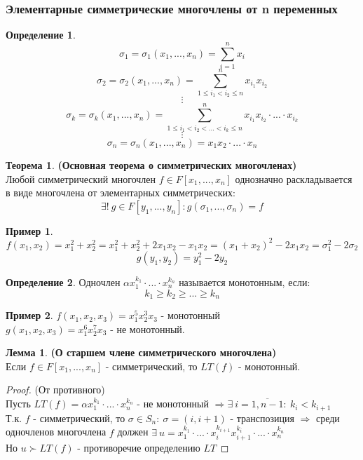 \documentclass[a4paper, 12pt]{article}
\newcommand\tab[1][.5cm]{\hspace*{#1}}
\newcounter{lemcount}
\newcounter{lemcount2}
\newcounter{thcount}
\theoremstyle{definition}
\newtheorem*{definition}{Определение}
\newtheorem*{example1}{Пример}
\newtheorem{lemmanum}[lemcount]{Лемма}
\newtheorem{theoremnum}[thcount]{Теорема}
\begin{document}
  \subsubsection{Элементарные симметрические многочлены от n переменных}
  \begin{definition}
    $$\sigma_1 = \sigma_1(x_1,...,x_n) = \sum \limits_{i=1}^n x_i$$
    $$\sigma_2 = \sigma_2(x_1,...,x_n) = \sum \limits_{1\leq i_1 < i_2 \leq n}^n x_{i_1}x_{i_2}$$
    $$\vdots$$ 
    $$\sigma_k = \sigma_k(x_1,...,x_n) = \sum \limits_{1\leq i_1 < i_2<...<i_k \leq n}^n x_{i_1}x_{i_2} \cdot ... \cdot x_{i_k}$$
    $$\vdots$$
    $$\sigma_n = \sigma_n(x_1,...,x_n) = x_{1}x_{2} \cdot ... \cdot x_{n}$$      
  \end{definition}
  \begin{theoremnum} \textbf{(Основная теорема о симметрических многочленах)} \\
    Любой симметрический многочлен $f \in F[x_1,...,x_n]$ однозначно раскладывается в виде многочлена от элементарных симметрических: 
    $$\exists ! \ g \in F[y_1,...,y_n] : g(\sigma_1,...,\sigma_n) = f$$
  \end{theoremnum}
  \begin{example1}
    $$f(x_1, x_2) = x_1^2 + x_2^2 = x_1^2 + x_2^2 + 2x_1x_2 - x_1x_2 = (x_1+x_2)^2 - 2x_1x_2 = \sigma_1^2 - 2 \sigma_2$$
    $$g(y_1,y_2) = y_1^2 - 2y_2$$  
  \end{example1}
  \begin{definition}
    Одночлен $\alpha x_1^{k_1} \cdot ... \cdot x_n^{k_n}$ называется монотонным, если: 
    $$k_1\geq k_2 \geq ... \geq k_n$$  
  \end{definition}
  \begin{example1}
    $f(x_1,x_2,x_3) = x_1^5x_2^3x_3$ - монотонный \\
    \tab[2.33cm]$g(x_1,x_2,x_3) = x_1^6x_2^7x_3$ - не монотонный.  
  \end{example1}
  \setcounter{lemcount}{0}
  \begin{lemmanum} \textbf{(О старшем члене симметрического многочлена)} \\
    Если $f \in F[x_1,...,x_n]$ - симметрический, то $LT(f)$ - монотонный. 
  \end{lemmanum}
  \begin{proof} (От противного)\\
    Пусть $LT(f) = \alpha x_1^{k_1} \cdot ... \cdot x_n^{k_n}$ - не монотонный $\Longrightarrow \exists \ i = \overline{1,n-1}: \ k_i<k_{i+1}$\\
    Т.к. $f$ - симметрический, то $\sigma \in S_n: \ \sigma = (i, i+1)$ - транспозиция $\Longrightarrow $ среди одночленов многочлена $f$ должен $\exists \ u = x_1^{k_1} \cdot ... \cdot x_i^{k_{i+1}}x_{i+1}^{k_i} \cdot ... \cdot x_n^{k_n}$\\
    Но $u \succ LT(f)$ - противоречие определению $LT$    
  \end{proof}
\end{document}
